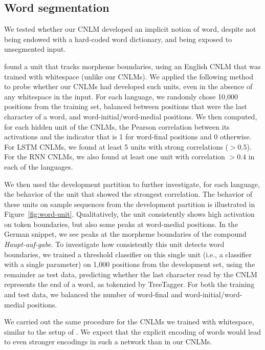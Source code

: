 \subsection{Word segmentation}
\label{sec:segmentation}


We tested whether our CNLM developed an implicit notion of word, despite not being endowed with a hard-coded word dictionary, and being exposed to unsegmented input. %


 found a unit that tracks morpheme boundaries, using an English CNLM that was trained with whitespace (unlike our CNLMs).
We applied the following method to probe whether our CNLMs had developed such units, even in the absence of any whitespace in the input.
For each language, we randomly chose 10,000 positions from the training set, balanced between positions that were the last character of a word, and word-initial/word-medial positions.
We then computed, for each hidden unit of the CNLMs, the Pearson correlation between its activations and the indicator that is 1 for word-final positions and 0 otherwise.
For LSTM CNLMs, we found at least 5 units with strong correlations ($>0.5$). For the RNN CNLMs, we also found at least one unit with correlation $> 0.4$ in each of the languages.

We then used the development partition to further investigate, for each language, the behavior of the unit that showed the strongest correlation.
The behavior of these units on sample sequences from the development partition is illustrated in Figure~\ref{fig:word-unit}.
Qualitatively, the unit consistently shows high activation on token boundaries, but also some peaks at word-medial positions.
In the German snippet, we see peaks at the morpheme boundaries of the compound \emph{Haupt-auf-gabe}.
To investigate how consistently this unit detects word boundaries, we trained a threshold classifier on this single unit (i.e., a classifier with a single parameter) on 1,000 positions from the development set, using the remainder as test data, predicting whether the last character read by the CNLM represents the end of a word, as tokenzied by TreeTagger.
For both the training and test data, we balanced the number of word-final and word-initial/word-medial positions.

We carried out the same procedure for the CNLMs we trained with whitespace, similar to the setup of .
We expect that the explicit encoding of words would lead to even stronger encodings in such a network than in our CNLMs.

